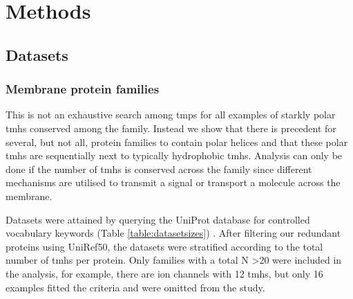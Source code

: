 \section{Methods}
\subsection{Datasets}
\subsubsection{Membrane protein families}
This is not an exhaustive search among \gls{tmp}s for all examples of starkly polar \gls{tmh}s conserved among the family.
Instead we show that there is precedent for several, but not all, protein families to contain polar helices and that these polar \gls{tmh}s are sequentially next to typically hydrophobic \gls{tmh}s.
Analysis can only be done if the number of \gls{tmh}s is conserved across the family since different mechanisms are utilised to transmit a signal or transport a molecule across the membrane.

Datasets were attained by querying the UniProt database for controlled vocabulary keywords (Table \ref{table:datasetsizes}) \cite{TheUniProtConsortium2014}.
After filtering our redundant proteins using UniRef50, the datasets were stratified according to the total number of \gls{tmh}s per protein.
Only families with a total N \textgreater  20 were included in the analysis, for example, there are ion channels with 12 \gls{tmh}s, but only 16 examples fitted the criteria and were omitted from the study.




